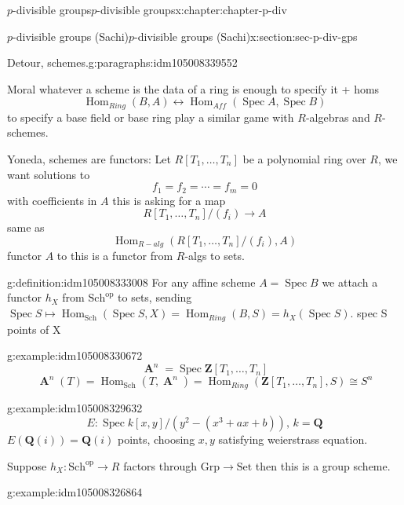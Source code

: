 \documentclass[oneside,10pt,]{book}
\numberwithin{equation}{section}
\newcommand{\lb}{[}
\newcommand{\rb}{]}
\newcommand{\ZZ}{\mathbf{Z}}
\newcommand{\QQ}{\mathbf{Q}}
\newcommand{\op}{\mathrm{op}}
\DeclareMathOperator{\Hom}{Hom}
\DeclareMathOperator{\Spec}{Spec}
\DeclareMathOperator{\aff}{\mathbf{A}}
\begin{document}
\begin{chapterptx}{\(p\)-divisible groups}{}{\(p\)-divisible groups}{}{}{x:chapter:chapter-p-div}
\begin{sectionptx}{\(p\)-divisible groups (Sachi)}{}{\(p\)-divisible groups (Sachi)}{}{}{x:section:sec-p-div-gps}
\begin{paragraphs}{Detour, schemes.}{g:paragraphs:idm105008339552}
%
\par
Moral whatever  a scheme is the data of a ring is enough to specify it + homs%
\begin{equation*}
\Hom_{Ring} (B,A) \leftrightarrow \Hom_{Aff}(\Spec A, \Spec B)
\end{equation*}
to specify a base field or base ring play a similar game with \(R\)-algebras and \(R\)-schemes.%
\par
Yoneda, schemes are functors: Let \(R\lb T_1,\ldots,T_n\rb \) be a polynomial ring over \(R\), we want solutions to%
\begin{equation*}
f_1=  f_2 = \cdots = f_m = 0
\end{equation*}
with coefficients in \(A\) this is asking for  a map%
\begin{equation*}
R\lb T_1, \ldots ,T_n] /(f_i) \to A
\end{equation*}
same as%
\begin{equation*}
\Hom_{R-alg} (R[T_1,\ldots, T_n] /(f_i), A)
\end{equation*}
functor \(A\) to this is a functor from \(R\)-algs to sets.%
\begin{definition}{}{g:definition:idm105008333008}%
For any affine scheme \(A = \Spec B\) we attach a functor \(h_X\) from \(\mathrm{Sch}^\op\) to sets, sending \(\Spec S \mapsto \Hom_{\mathrm{Sch}} (\Spec S, X) = \Hom_{Ring} (B,S) = h_X(\Spec S)\). spec S points of X%
\end{definition}
\begin{example}{}{g:example:idm105008330672}%
%
\begin{equation*}
\aff^n = \Spec \ZZ \lb T_1,\ldots, T_n\rb
\end{equation*}
%
\begin{equation*}
\aff^n(T) = \Hom_{\mathrm{Sch}} (T, \aff^n) = \Hom_{Ring}(\ZZ[T_1,\ldots, T_n], S)\cong S^n
\end{equation*}
%
\end{example}
\begin{example}{}{g:example:idm105008329632}%
%
\begin{equation*}
E \colon \Spec k[x,y] / (y^2 - (x^3 + ax +b)),\,k = \QQ
\end{equation*}
\(E(\QQ(i)) = \QQ(i)\) points, choosing \(x,y\) satisfying weierstrass equation.%
\end{example}
Suppose \(h_X \colon \mathrm{Sch}^\op \to R\) factors through \(\mathrm{Grp} \to \mathrm{Set}\) then this is a group scheme.%
\begin{example}{}{g:example:idm105008326864}%

\end{example}
\end{paragraphs}
\end{sectionptx}
\end{chapterptx}
\end{document}
